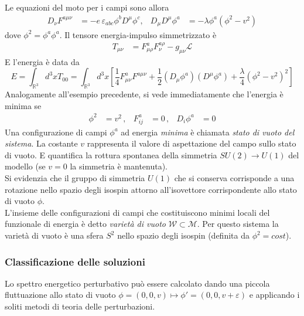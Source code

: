 Le equazioni del moto per i campi sono allora
\begin{equation}\label{eq:nabeqmotion}
   \begin{aligned}
      D_\nu F ^{a\mu\nu} & = -e \, \varepsilon_{abc} \phi^b D^\mu \phi^c, &
      D_\mu D^\mu \phi^a & = - \lambda \phi^a (\phi^2 - v^2 )
   \end{aligned}
\end{equation}
dove $\phi^2 = \phi^a\phi^a$. Il tensore energia-impulso simmetrizzato è
\begin{equation}
   \begin{aligned}
      T_{\mu\nu} & =
         F^a _{\mu\rho}F^{a\rho}_\nu - g_{\mu\nu} \mathcal{L}
   \end{aligned}
\end{equation}
E l'energia è data da
\begin{equation}
   E = \int_{\mathbb{R}^3} d^3x T_{00}
     = \int_{\mathbb{R}^3} d^3x \left[ \frac{1}{4} F^a_{\mu\nu}F^{a\mu\nu}
        + \frac{1}{2} (D_\mu \phi^a) (D^\mu \phi^a)
        + \frac{\lambda}{4}(\phi^2 - v^2)^2 \right]
\end{equation}
Analogamente all'esempio precedente, si vede immediatamente che l'energia è minima se
\begin{equation}
   \begin{aligned}
      \phi^2 & = v^2 \, , &
      F^a_{ij} & = 0 \, , &
      D_i \phi^a & = 0
   \end{aligned}
\end{equation}
Una configurazione di campi $\phi^a$ ad energia \emph{minima} è chiamata
\emph{stato di vuoto del sistema}. La costante $v$ rappresenta il valore di
aspettazione del campo sullo stato di vuoto. E quantifica la rottura spontanea
della simmetria $SU(2) \to U(1)$ del modello (se $v=0$ la simmetria è mantenuta).\\
Si evidenzia che il gruppo di simmetria $U(1)$ che si conserva corrisponde a
una rotazione nello spazio degli isospin attorno all'isovettore corrispondente
allo stato di vuoto $\phi$.\\

L'insieme delle configurazioni di campi che costituiscono minimi locali
del funzionale di energia è detto \emph{varietà di vuoto}
$\mathcal{W} \subset \mathcal{M}$. Per questo sistema la varietà di vuoto è una
sfera $S^2$ nello spazio degli isospin (definita da $\phi^2 = cost$).\\
\subsubsection{Classificazione delle soluzioni}
Lo spettro energetico perturbativo può essere calcolato dando una piccola fluttuazione
allo stato di vuoto $\phi = (0,0,v) \mapsto \phi' = (0,0,v + \varepsilon)$ e applicando
i soliti metodi di teoria delle perturbazioni.\\

